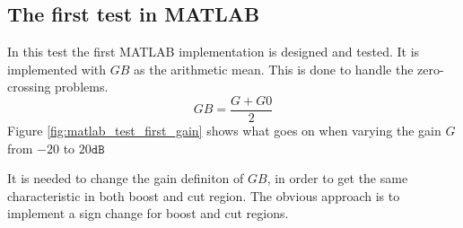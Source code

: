 \subsection{The first test in MATLAB}
In this test the first MATLAB implementation is designed and tested. 
It is implemented with $GB$ as the arithmetic mean. This is done to handle the zero-crossing problems. 
\begin{equation}
    GB = \frac{G+G0}{2}    
\end{equation}
Figure \ref{fig:matlab_test_first_gain} shows what goes on when varying the gain $G$ from $-20$ to $20\texttt{dB}$

It is needed to change the gain definiton of $GB$, in order to get the same characteristic in both boost and cut region.
The obvious approach is to implement a sign change for boost and cut regions.
\label{task:20140925_jm1}
